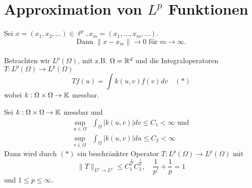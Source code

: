
\section{Approximation von $L^{p}$ Funktionen}



Sei $x = (x_{1}, x_{2}, \dotsc) \in \ell^{p}, x_{m} = (x_{1}, \dotsc, x_{m}, \dotsc)$. \\
\[ \text{Dann }\|  x - x_{m} \| \rightarrow 0 \text{ für } m \rightarrow \infty. \]
\\
Betrachten wir $L^{p}(\Omega)$, mit z.B. $\Omega = \mathbb{R}^{d}$ und die Integraloperatoren $T :	L^{p}(\Omega) \rightarrow L^{p}(\Omega)$
	\[ T f(u) = \int k(u, v) f(v) dv \quad (*) \label{eq:8.0-BeschrOperatorInLp} \]
wobei $k : \Omega \times \Omega \rightarrow \mathbb{K}$ messbar.

\begin{satz} \label{satz:8.1}
	Sei $k : \Omega \times \Omega \rightarrow \mathbb{K}$ messbar	und
	\begin{align*}
		\sup_{u \in \Omega} & \int_{\Omega} |k(u, v)| dv \leq C_{1} < \infty \text{ und} \\
		\sup_{v \in \Omega} & \int_{\Omega} |k(u, v)| du \leq C_{2} < \infty
	\end{align*}
	Dann wird durch \hyperref[eq:8.0-BeschrOperatorInLp]{$(*)$} ein beschränkter Operator $T : L^{p}(\Omega) \rightarrow L^{p}(\Omega)$ mit
	\[ \| T \|_{L^{p} \rightarrow L^{p}} \leq C_{1}^{\frac{1}{p'}} C_{1}^{\frac{1}{p}}, \quad \frac{1}{p'} + \frac{1}{p} = 1   \]
	und $1 \leq p \leq \infty$.
\end{satz}

